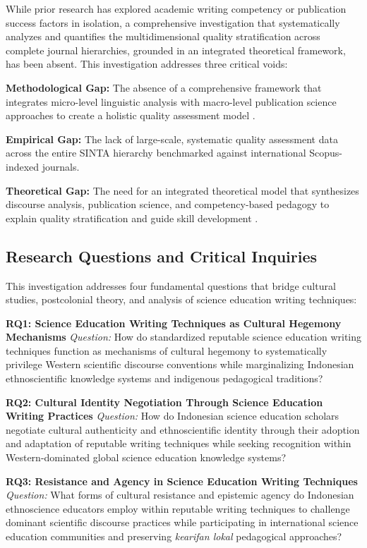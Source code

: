 \documentclass[journal,article,submit,pdftex,moreauthors]{Definitions/mdpi}
\begin{document}
While prior research has explored academic writing competency \citep{hyland2005,belcher2019} or publication success factors \citep{swales2004} in isolation, a comprehensive investigation that systematically analyzes and quantifies the multidimensional quality stratification across complete journal hierarchies, grounded in an integrated theoretical framework, has been absent. This investigation addresses three critical voids:

\textbf{Methodological Gap:} The absence of a comprehensive framework that integrates micro-level linguistic analysis with macro-level publication science approaches to create a holistic quality assessment model \citep{mayring2014}. 

\textbf{Empirical Gap:} The lack of large-scale, systematic quality assessment data across the entire SINTA hierarchy benchmarked against international Scopus-indexed journals. 

\textbf{Theoretical Gap:} The need for an integrated theoretical model that synthesizes discourse analysis, publication science, and competency-based pedagogy to explain quality stratification and guide skill development \citep{creswell2018}.

\subsection{Research Questions and Critical Inquiries}

This investigation addresses four fundamental questions that bridge cultural studies, postcolonial theory, and analysis of science education writing techniques:

\textbf{RQ1: Science Education Writing Techniques as Cultural Hegemony Mechanisms}
\textit{Question:} How do standardized reputable science education writing techniques function as mechanisms of cultural hegemony to systematically privilege Western scientific discourse conventions while marginalizing Indonesian ethnoscientific knowledge systems and indigenous pedagogical traditions?

\textbf{RQ2: Cultural Identity Negotiation Through Science Education Writing Practices}
\textit{Question:} How do Indonesian science education scholars negotiate cultural authenticity and ethnoscientific identity through their adoption and adaptation of reputable writing techniques while seeking recognition within Western-dominated global science education knowledge systems?

\textbf{RQ3: Resistance and Agency in Science Education Writing Techniques}
\textit{Question:} What forms of cultural resistance and epistemic agency do Indonesian ethnoscience educators employ within reputable writing techniques to challenge dominant scientific discourse practices while participating in international science education communities and preserving \textit{kearifan lokal} pedagogical approaches?
\end{document}
